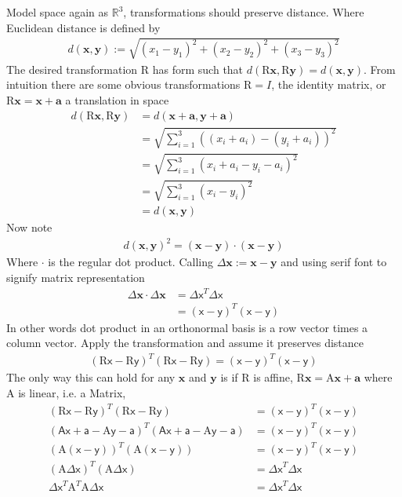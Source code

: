 \documentclass[twocolumn,floatfix,aps,prd,amsmath,amssymb]{revtex4}
\begin{document}
Model space again as $\mathbb{R}^3$, transformations should preserve distance. Where Euclidean distance is defined by
\begin{align*}
d(\mathbf{x},\mathbf{y}):= \sqrt{(x_1-y_1)^2+(x_2-y_2)^2+(x_3-y_3)^2}
\end{align*}
 The desired transformation $\mathrm{R}$ has form such that $d(\mathrm{R}\mathbf{x},\mathrm{R}\mathbf{y}) = d(\mathbf{x},\mathbf{y})$. From intuition there are some obvious transformations $\mathrm{R}=I$, the identity matrix, or $\mathrm{R}\mathbf{x} = \mathbf{x}+\mathbf{a}$ a translation in space
\begin{align*}
d(\mathrm{R}\mathbf{x},\mathrm{R}\mathbf{y}) &= d(\mathbf{x}+\mathbf{a},\mathbf{y}+\mathbf{a}) \\
&= \sqrt{\sum_{i=1}^3((x_i+a_i)-(y_i+a_i))^2} \\
&= \sqrt{\sum_{i=1}^3(x_i+a_i-y_i-a_i)^2} \\
&= \sqrt{\sum_{i=1}^3(x_i-y_i)^2} \\
&= d(\mathbf{x},\mathbf{y})
\end{align*}
Now note
\begin{align*}
d(\mathbf{x},\mathbf{y})^2=(\mathbf{x}-\mathbf{y})\cdot(\mathbf{x}-\mathbf{y})
\end{align*}
Where $\cdot$ is the regular dot product. Calling $\Delta\mathbf{x}:=\mathbf{x}-\mathbf{y}$ and using serif font to signify matrix representation
\begin{align*}
\Delta\mathbf{x}\cdot\Delta\mathbf{x} &= \mathsf{\Delta x}^T \mathsf{\Delta x} \\
&= (\mathsf{x}-\mathsf{y})^T(\mathsf{x}-\mathsf{y})
\end{align*}
In other words dot product in an orthonormal basis is a row vector times a column vector. Apply the transformation and assume it preserves distance
\begin{align*}
(\mathrm{R}\mathsf{x}-\mathrm{R}\mathsf{y})^T(\mathrm{R}\mathsf{x}-\mathrm{R}\mathsf{y}) = (\mathsf{x}-\mathsf{y})^T(\mathsf{x}-\mathsf{y})
\end{align*}
The only way this can hold for any $\mathbf{x}$ and $\mathbf{y}$ is if $\mathrm{R}$ is affine, $\mathrm{R}\mathbf{x}=\mathrm{A}\mathbf{x}+\mathbf{a}$ where $\mathrm{A}$ is linear, i.e. a Matrix,
\begin{align*}
(\mathrm{R}\mathsf{x}-\mathrm{R}\mathsf{y})^T(\mathrm{R}\mathsf{x}-\mathrm{R}\mathsf{y}) &= (\mathsf{x}-\mathsf{y})^T(\mathsf{x}-\mathsf{y}) \\
(\mathsf{A}\mathsf{x}+\mathsf{a}-\mathrm{A}\mathsf{y}-\mathsf{a})^T(\mathsf{A}\mathsf{x}+\mathsf{a}-\mathrm{A}\mathsf{y}-\mathsf{a}) &= (\mathsf{x}-\mathsf{y})^T(\mathsf{x}-\mathsf{y})\\
(\mathrm{A}(\mathsf{x}-\mathsf{y}))^T(\mathrm{A}(\mathsf{x}-\mathsf{y})) &= (\mathsf{x}-\mathsf{y})^T(\mathsf{x}-\mathsf{y}) \\
(\mathrm{A}\mathsf{\Delta x})^T(\mathrm{A}\mathsf{\Delta x}) &= \mathsf{\Delta x}^T\mathsf{\Delta x} \\
\mathsf{\Delta x}^T\mathrm{A}^T\mathrm{A}\mathsf{\Delta x} &= \mathsf{\Delta x}^T\mathsf{\Delta x}
\end{align*}
\end{document}

